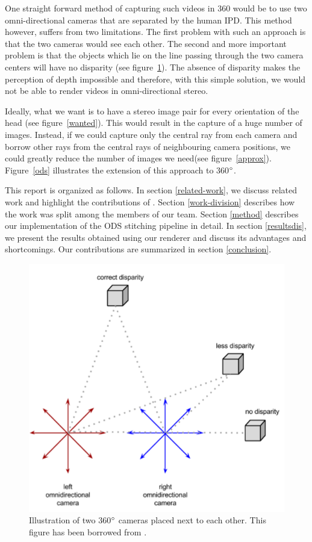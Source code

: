 \documentclass[10pt,twocolumn,letterpaper]{article}
\begin{document}
One straight forward method of capturing such videos in 360 would be to use two omni-directional cameras that are separated by the human IPD. This method however, suffers from two limitations. The first problem with such an approach is that the two cameras would see each other. The second and more important problem is that the objects which lie on the line passing through the two camera centers will have no disparity (see figure~\ref{two_360}). The absence of disparity makes the perception of depth impossible and therefore, with this simple solution, we would not be able to render  videos in omni-directional stereo.

Ideally, what we want is to have a stereo image pair for every orientation of the head (see figure~\ref{wanted}). This would result in the capture of a huge number of images. Instead, if we could capture only the central ray from each camera and borrow other rays from the central rays of neighbouring camera positions, we could greatly reduce the number of images we need(see figure~\ref{approx}). Figure~\ref{ods} illustrates the extension of this approach to 360$\degree$.

This report is organized as follows. In section \ref{related-work}, we discuss related work and highlight the contributions of \cite{jump16}. Section \ref{work-division} describes how the work was split among the members of our team. Section \ref{method} describes our implementation of the ODS stitching pipeline in detail. In section \ref{resultsdis}, we present the results obtained using our renderer and discuss its advantages and shortcomings. Our contributions are summarized in section \ref{conclusion}.

\begin{figure}[t]
\begin{center}
   \includegraphics[width=0.8\linewidth]{pictures/two_360.png}
\end{center}
   \caption{Illustration of two 360$\degree$ cameras placed next to each other. This figure has been borrowed from \cite{ods}.}
\label{two_360}
\end{figure}
\end{document}
